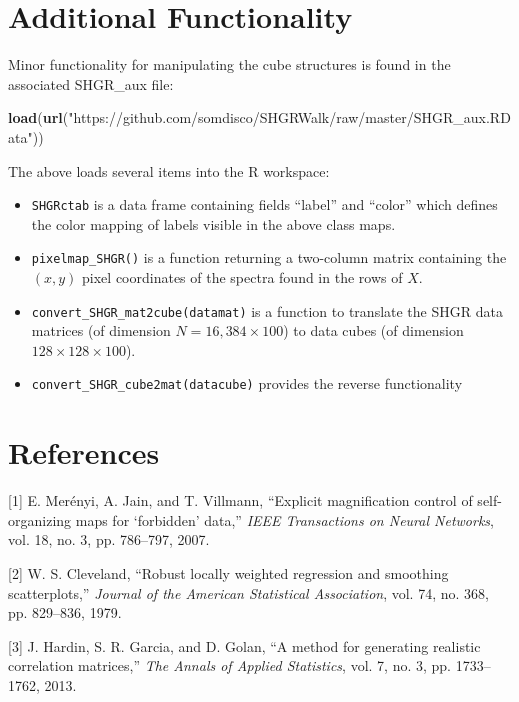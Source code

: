 \documentclass[]{article}
\newenvironment{Shaded}{\begin{snugshade}}{\end{snugshade}}
\newcommand{\KeywordTok}[1]{\textcolor[rgb]{0.13,0.29,0.53}{\textbf{#1}}}
\newcommand{\NormalTok}[1]{#1}
\newcommand{\StringTok}[1]{\textcolor[rgb]{0.31,0.60,0.02}{#1}}
\providecommand{\tightlist}{%
  \setlength{\itemsep}{0pt}\setlength{\parskip}{0pt}}
\begin{document}
\hypertarget{additional-functionality}{%
\section{Additional Functionality}\label{additional-functionality}}

Minor functionality for manipulating the cube structures is found in the associated SHGR\_aux file:

\begin{Shaded}
\begin{Highlighting}[]
\KeywordTok{load}\NormalTok{(}\KeywordTok{url}\NormalTok{(}\StringTok{"https://github.com/somdisco/SHGRWalk/raw/master/SHGR_aux.RData"}\NormalTok{))}
\end{Highlighting}
\end{Shaded}

The above loads several items into the R workspace:

\begin{itemize}
\tightlist
\item
  \texttt{SHGRctab} is a data frame containing fields ``label'' and ``color'' which defines the color mapping of labels visible in the above class maps.\\
\item
  \texttt{pixelmap\_SHGR()} is a function returning a two-column matrix containing the \((x,y)\) pixel coordinates of the spectra found in the rows of \(X\).
\item
  \texttt{convert\_SHGR\_mat2cube(datamat)} is a function to translate the SHGR data matrices (of dimension \(N = 16,384 \times 100\)) to data cubes (of dimension \(128 \times 128 \times 100\)).
\item
  \texttt{convert\_SHGR\_cube2mat(datacube)} provides the reverse functionality
\end{itemize}

\hypertarget{references}{%
\section{References}\label{references}}

\hypertarget{refs}{}
\leavevmode\hypertarget{ref-MerenyiJainVillmann}{}%
{[}1{]} E. Merényi, A. Jain, and T. Villmann, ``Explicit magnification control of self-organizing maps for `forbidden' data,'' \emph{IEEE Transactions on Neural Networks}, vol. 18, no. 3, pp. 786--797, 2007.

\leavevmode\hypertarget{ref-Lowess}{}%
{[}2{]} W. S. Cleveland, ``Robust locally weighted regression and smoothing scatterplots,'' \emph{Journal of the American Statistical Association}, vol. 74, no. 368, pp. 829--836, 1979.

\leavevmode\hypertarget{ref-Toeplitz}{}%
{[}3{]} J. Hardin, S. R. Garcia, and D. Golan, ``A method for generating realistic correlation matrices,'' \emph{The Annals of Applied Statistics}, vol. 7, no. 3, pp. 1733--1762, 2013.
\end{document}

